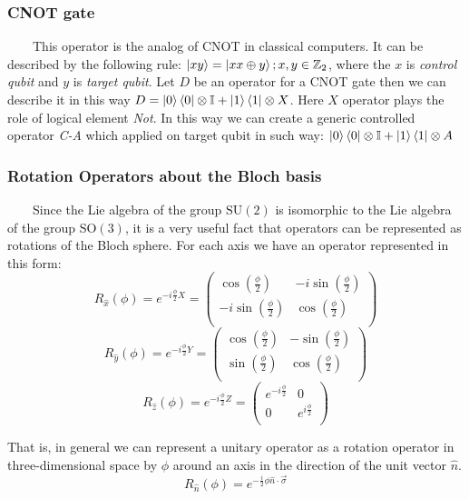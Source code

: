 \documentclass[english,14pt,a4paper]{article}
\begin{document}
	\subsubsection{CNOT gate}\ \ \ \
	This operator is the analog of CNOT in classical computers. It can be described by the following rule: $\ket{xy} = \ket{x x \oplus y}; x, y \in \mathbb{Z}_2$, where the $x$ is \textit{control qubit} and $y$ is \textit{target qubit}. Let $D$ be an operator for a CNOT gate then we can describe it in this way $D = \ket{0}\bra{0} \otimes \mathbb{I} + \ket{1}\bra{1} \otimes X$. Here $X$ operator plays the role of logical element \textit{Not}. In this way we can create a generic controlled operator \textit{C-A} which applied on target qubit in such way: $\ket{0}\bra{0} \otimes \mathbb{I} + \ket{1}\bra{1} \otimes A $
	\subsubsection{Rotation Operators about the Bloch basis}\ \ \ \
	Since the Lie algebra of the group $\text{SU}(2)$ is isomorphic to the Lie algebra of the group $\text{SO}(3)$, it is a very useful fact that operators can be represented as rotations of the Bloch sphere. For each axis we have an operator represented in this form:
	\[
		R_{\hat{x}}(\phi) = e^{-i\frac{\phi}{2}X} = \begin{pmatrix}
			\cos(\frac{\phi}{2}) & -i\sin(\frac{\phi}{2}) \\
			-i\sin(\frac{\phi}{2}) & \cos(\frac{\phi}{2}) \\
		\end{pmatrix}	
	\]
	\[
	R_{\hat{y}}(\phi) = e^{-i\frac{\phi}{2}Y} = \begin{pmatrix}
		\cos(\frac{\phi}{2}) & -\sin(\frac{\phi}{2}) \\
		\sin(\frac{\phi}{2}) & \cos(\frac{\phi}{2}) \\
	\end{pmatrix}	
	\]
	\[
	R_{\hat{z}}(\phi) = e^{-i\frac{\phi}{2}Z} = \begin{pmatrix}
		e^{-i\frac{\phi}{2}} & 0 \\
		0 &  e^{i\frac{\phi}{2}}\\
	\end{pmatrix}	
	\]
	
	That is, in general we can represent a unitary operator as a rotation operator in three-dimensional space by $\phi$ around an axis in the direction of the unit vector $\hat{n}$.
	 \begin{equation}
	 R_{\hat{n}}(\phi) = e^{-\frac{i}{2}\phi \hat{n}\cdot \vec{\sigma}}
	\end{equation}
	
\end{document}

